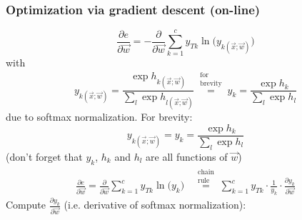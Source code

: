 \begin{frame}\frametitle{Optimization via gradient descent (on-line)}
	\begin{equation}
			\frac{\partial e}{\partial \vec{w}}
		=  - \frac{\partial}{\partial \vec{w}} 
		  	\sum_{k = 1}^c y_{Tk} 
		  	\ln \big(y_{k (\vec{x}; \vec{w})}\big)
	\end{equation}
	with
	\begin{equation}
		  	y_{k (\vec{x};\vec{w})} = \frac{\exp h_{k (\vec{x};\vec{w})}}
		  		{\sum_l \exp h_{l (\vec{x};\vec{w})}}
		  	\stackrel{\substack{\text{for}\\\text{brevity}}}{=} 
		  	y_{k} = \frac{\exp h_{k}}
		  		{\sum_l \exp h_{l}}
	\end{equation}
	due to softmax normalization.
	For brevity:
	\begin{equation}
		  	y_{k (\vec{x};\vec{w})} = 
		  	y_{k} = \frac{\exp h_{k}}
		  		{\sum_l \exp h_{l}}
	\end{equation}
	(don't forget that $y_k$, $h_k$ and $h_l$ are all functions of $\vec w$)
	\begin{align}
	\frac{\partial e}{\partial \vec{w}} =
	\frac{\partial}{\partial \vec{w}} 
		  	\sum_{k = 1}^c y_{Tk}
		  	\ln \big(y_{k}\big)
		& \stackrel{\substack{\text{chain}\\\text{rule}}}{=} 
		\sum\limits_{k = 1}^c y_{Tk} \cdot \frac{1}{y_k} \cdot \frac{\partial y_k}{\partial \vec{w}}
	\end{align}
	Compute $\frac{\partial y_k}{\partial \vec{w}}$ (i.e. derivative of softmax normalization):
	

\end{frame}

